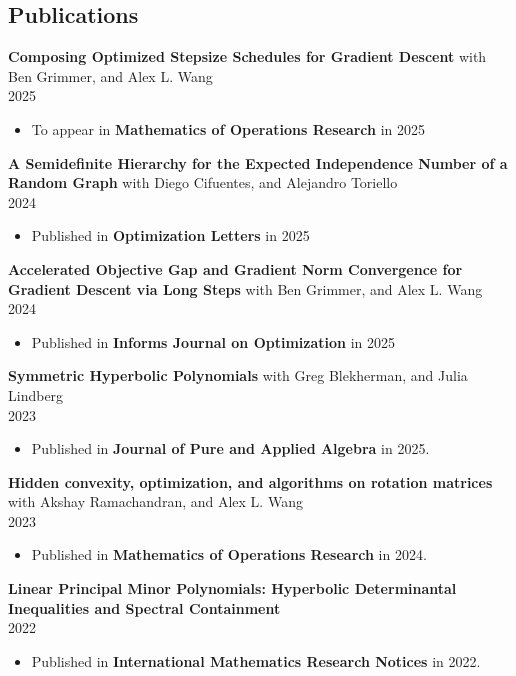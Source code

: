 \documentclass[margin]{res}
\begin{document}
\begin{resume}
\section{Publications}
{\bf  Composing Optimized Stepsize Schedules for Gradient Descent} with Ben Grimmer, and Alex L. Wang \\ 2025
\begin{itemize} \itemsep -2pt %
\item To appear in \textbf{Mathematics of Operations Research} in 2025
\end{itemize}
{\bf  A Semidefinite Hierarchy for the Expected Independence Number of a Random Graph} with Diego Cifuentes, and Alejandro Toriello \\ 2024
\begin{itemize} \itemsep -2pt %
\item Published in \textbf{Optimization Letters} in 2025
\end{itemize}
{\bf  Accelerated Objective Gap and Gradient Norm Convergence for Gradient Descent via Long Steps} with Ben Grimmer, and Alex L. Wang \\ 2024
\begin{itemize} \itemsep -2pt %
\item Published in \textbf{Informs Journal on Optimization} in 2025
\end{itemize}
{\bf  Symmetric Hyperbolic Polynomials} with Greg Blekherman, and Julia Lindberg \\ 2023
\begin{itemize} \itemsep -2pt %
\item Published in \textbf{Journal of Pure and Applied Algebra} in 2025.
\end{itemize}
{\bf  Hidden convexity, optimization, and algorithms on rotation matrices  } with Akshay Ramachandran, and Alex L. Wang\\ 2023
\begin{itemize} \itemsep -2pt %
\item Published in \textbf{Mathematics of Operations Research} in 2024.
\end{itemize}
{\bf  Linear Principal Minor Polynomials: Hyperbolic Determinantal Inequalities and Spectral Containment } \\ 2022
\begin{itemize} \itemsep -2pt %
\item Published in \textbf{International Mathematics Research Notices} in 2022.

\end{itemize}
\end{resume}
\end{document}
